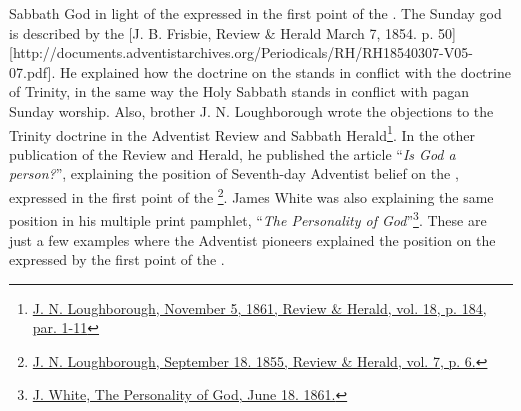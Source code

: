 Sabbath God in light of the  expressed in the first point of the . The Sunday god is described by the [J. B. Frisbie, Review \& Herald March 7, 1854. p. 50][http://documents.adventistarchives.org/Periodicals/RH/RH18540307-V05-07.pdf]. He explained how the doctrine on the  stands in conflict with the doctrine of Trinity, in the same way the Holy Sabbath stands in conflict with pagan Sunday worship. Also, brother J. N. Loughborough wrote the objections to the Trinity doctrine in the Adventist Review and Sabbath Herald\footnote{\href{https://adventistdigitallibrary.org/adl-349160/advent-review-and-sabbath-herald-november-5-1861}{J. N. Loughborough, November 5, 1861, Review \& Herald, vol. 18, p. 184, par. 1-11}}. In the other publication of the Review and Herald, he published the article “\textit{Is God a person?}”, explaining the position of Seventh-day Adventist belief on the , expressed in the first point of the \footnote{\href{http://documents.adventistarchives.org/Periodicals/RH/RH18550918-V07-06.pdf}{J. N. Loughborough, September 18. 1855, Review \& Herald, vol. 7, p. 6.}}. James White was also explaining the same position in his multiple print pamphlet, “\textit{The Personality of God}”\footnote{\href{https://egwwritings.org/?ref=en_PERGO.1.1&para=1471.3}{J. White, The Personality of God, June 18. 1861.}}. These are just a few examples where the Adventist pioneers explained the position on the  expressed by the first point of the .


